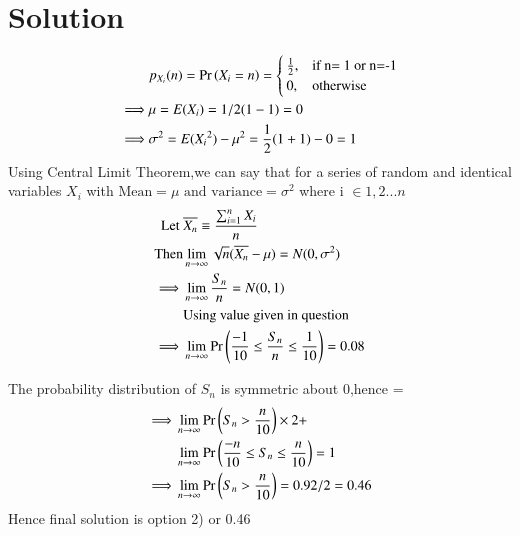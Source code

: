 \documentclass[journal,12pt,twocolumn]{IEEEtran}
\begin{document}
\section{Solution}
\begin{align}
   &p_{X_i} (n)=\Pr\left(X_i = n\right)=\nonumber \begin{cases}
            \frac{1}{2}, &\text{if n= 1 or n=-1}\\
             0, &\text{otherwise}\\
            \end{cases} \\ 
    \implies& \mu=E(X_i)=1/2(1-1)=0\\
    \implies& \sigma^2=E({X_i}^2) -\mu^2=\frac{1}{2}(1+1) -0=1
\end{align}
Using Central Limit Theorem,we can say that for a series of random and identical variables \(X_i\) with \(\text{Mean} =\mu \text{ and variance}=\sigma^2  \)  where
i \(\in {1,2...n}\)
\begin{align}
 \text{Let }&\overline{X_n} \equiv \frac{\sum_{i=1}^n X_i}{n}\\
 \text{Then}& \lim_{n\to\infty}\sqrt{n}(\overline{X_n}-\mu)=N(0,\sigma^2)\\
\implies &\lim_{n\to\infty}\frac{S_n}{n}=N(0,1)\\
\nonumber& \text{Using value given in question }\\
\implies&\lim_{n\to\infty}\Pr\left(\frac{-1}{10}\leq \frac{S_n}{n} \leq\frac{1}{10}\right)=0.08
\end{align}
 
The probability distribution of \(S_n\) is symmetric about 0,hence  = 
\begin{align}
 \implies &\lim_{n\to\infty}\Pr\left(S_n>\frac{n}{10}\right)\times 2 +\\ \nonumber 
 &\lim_{n\to\infty}\Pr\left(\frac{-n}{10} \leq S_n \leq \frac{n}{10}\right) =1\\
\implies&  \lim_{n\to\infty}\Pr\left(S_n>\frac{n}{10}\right)=0.92/2=0.46
\end{align}
Hence final solution is option 2) or 0.46
\end{document}

